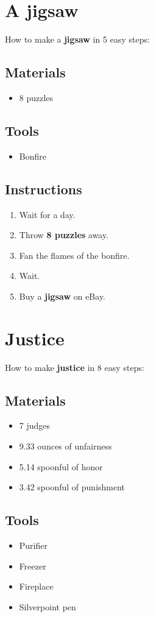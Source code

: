 \documentclass{article}
\begin{document}
\section{A jigsaw}How to make a \textbf{jigsaw} in 5 easy steps:

\subsection{Materials}\begin{itemize}
\item 
8 puzzles
\end{itemize}
\subsection{Tools}\begin{itemize}
\item 
Bonfire
\end{itemize}
\subsection{Instructions}\begin{enumerate}
\item 
Wait for a day.
\item 
Throw \textbf{8 puzzles} away.
\item 
Fan the flames of the bonfire.
\item 
Wait.
\item 
Buy a \textbf{jigsaw} on eBay.
\end{enumerate}
\newpage
\section{Justice}How to make \textbf{justice} in 8 easy steps:

\subsection{Materials}\begin{itemize}
\item 
7 judges
\item 
9.33 ounces of unfairness
\item 
5.14 spoonful of honor
\item 
3.42 spoonful of punishment
\end{itemize}
\subsection{Tools}\begin{itemize}
\item 
Purifier
\item 
Freezer
\item 
Fireplace
\item 
Silverpoint pen
\end{itemize}
\end{document}
